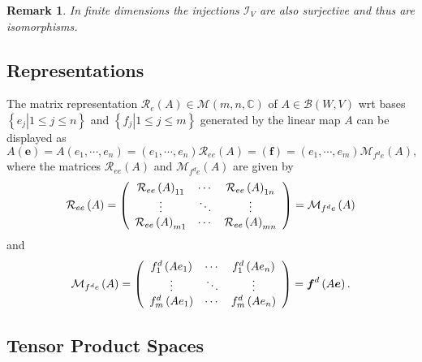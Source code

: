\documentclass[aps,preprint]{revtex4}%
\newtheorem{remark}[theorem]{Remark}
\begin{document}
\begin{remark}
In finite dimensions the injections $\mathcal{I}_{V}$ are also surjective and
thus are isomorphisms.
\end{remark}

\subsection{Representations}

The matrix representation $\mathcal{R}_{e}\left(  A\right)  \in\mathcal{M}%
\left(  m,n,\mathbb{C}\right)  $ of $A\in\mathcal{B}\left(  W,V\right)  $ wrt
bases $\left\{  \left.  e_{j}\right\vert 1\leq j\leq n\right\}  $ and
$\left\{  \left.  f_{j}\right\vert 1\leq j\leq m\right\}  $ generated by the
linear map $A$ can be displayed as
\begin{equation}
A\left(  \boldsymbol{e}\right)  =A\left(  e_{1},\cdots,e_{n}\right)  =\left(
e_{1},\cdots,e_{n}\right)  \mathcal{R}_{ee}\left(  A\right)  =\left(
\boldsymbol{f}\right)  =\left(  e_{1},\cdots,e_{m}\right)  \mathcal{M}%
_{f^{d}e}\left(  A\right)  ,
\end{equation}
where the matrices $\mathcal{R}_{ee}\left(  A\right)  $ and $\mathcal{M}%
_{f^{d}e}\left(  A\right)  $ are given by
\begin{equation}
\mathcal{R}_{ee}\left(  A\right)  =\left(
\begin{array}
[c]{ccc}%
\mathcal{R}_{ee}\left(  A\right)  _{11} & \cdots & \mathcal{R}_{ee}\left(
A\right)  _{1n}\\
\vdots & \ddots & \vdots\\
\mathcal{R}_{ee}\left(  A\right)  _{m1} & \cdots & \mathcal{R}_{ee}\left(
A\right)  _{mn}%
\end{array}
\right)  =\mathcal{M}_{f^{d}e}\left(  A\right)
\end{equation}
and%
\begin{equation}
\mathcal{M}_{f^{d}e}\left(  A\right)  =\left(
\begin{array}
[c]{ccc}%
f_{1}^{d}\left(  Ae_{1}\right)  & \cdots & f_{1}^{d}\left(  Ae_{n}\right) \\
\vdots & \ddots & \vdots\\
f_{m}^{d}\left(  Ae_{1}\right)  & \cdots & f_{m}^{d}\left(  Ae_{n}\right)
\end{array}
\right)  =\boldsymbol{f}^{d}\left(  A\boldsymbol{e}\right)  .
\end{equation}


\subsection{Tensor Product Spaces}
\end{document}

